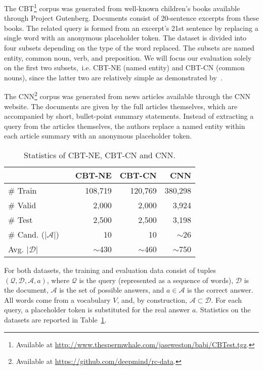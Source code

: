 \documentclass[11pt]{article}
\begin{document}
The CBT\footnote{Available at \url{http://www.thespermwhale.com/jaseweston/babi/CBTest.tgz}.} corpus was generated from well-known children's books available through Project Gutenberg. Documents consist of 20-sentence excerpts from these books. The related query is formed from an excerpt's 21st sentence by replacing a single word with an anonymous placeholder token. The dataset is divided into four subsets depending on the type of the word replaced.
The subsets are named entity, common noun, verb, and preposition. We will focus our evaluation solely on the first two subsets,~i.e. CBT-NE (named entity) and CBT-CN (common nouns), since the latter two are relatively simple as demonstrated by~\cite{hill2015goldilocks}.

The CNN\footnote{Available at \url{https://github.com/deepmind/rc-data}.} corpus was generated from news articles available through the CNN website. The documents are given by the full articles themselves, which are accompanied by short, bullet-point summary statements. Instead of extracting a query from the articles themselves, the authors replace a named entity within each article summary with an anonymous placeholder token.
\begin{table}[t]
\centering
\vspace{3mm}
\begin{tabular}{lrrrr}
\toprule
&  & CBT-NE & CBT-CN & CNN \\
\midrule
\# Train &  & 108,719 & 120,769 & 380,298      \\
\# Valid &  & 2,000    & 2,000      & 3,924    \\
\# Test  &  & 2,500    & 2,500      & 3,198    \\
\# Cand. ($|\mathcal{A}|$) & & 10 & 10        & $\sim$26 \\
Avg. $|\mathcal{D}|$ && $\sim$430 & $\sim$460 & $\sim$750 \\
\bottomrule
\end{tabular}
\caption{\label{tab:stats}Statistics of CBT-NE, CBT-CN and CNN.}
\end{table}

For both datasets, the training and evaluation data consist of tuples $(\mathcal{Q}, \mathcal{D}, \mathcal{A}, a)$, where $\mathcal{Q}$ is the query (represented as a sequence of words), $\mathcal{D}$ is the document, $\mathcal{A}$ is the set of possible answers, and $a \in \mathcal{A}$ is the correct answer. All words come from a vocabulary $V$, and, by construction, $\mathcal{A} \subset \mathcal{D}$. For each query, a placeholder token is substituted for the real answer $a$. Statistics on the datasets are reported in Table~\ref{tab:stats}.
 
\end{document}

